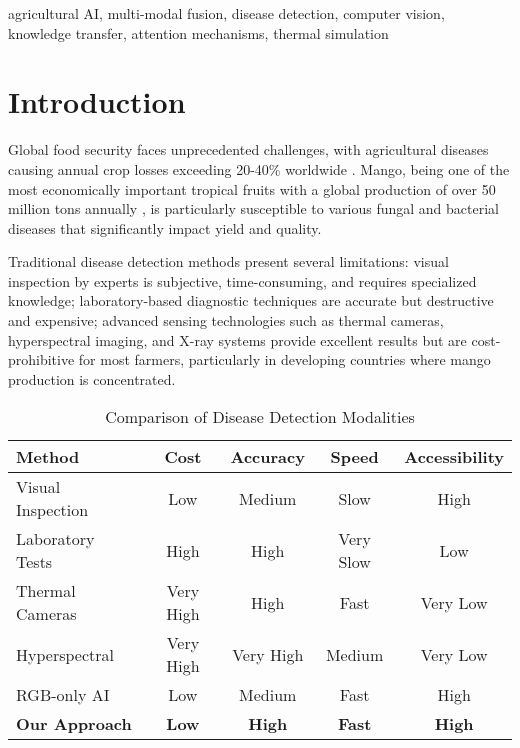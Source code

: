 \documentclass[conference]{IEEEtran}
\begin{document}
\begin{IEEEkeywords}
agricultural AI, multi-modal fusion, disease detection, computer vision, knowledge transfer, attention mechanisms, thermal simulation
\end{IEEEkeywords}

\section{Introduction}

Global food security faces unprecedented challenges, with agricultural diseases causing annual crop losses exceeding 20-40\% worldwide \cite{savary2019global}. Mango, being one of the most economically important tropical fruits with a global production of over 50 million tons annually \cite{fao2022}, is particularly susceptible to various fungal and bacterial diseases that significantly impact yield and quality.

Traditional disease detection methods present several limitations: visual inspection by experts is subjective, time-consuming, and requires specialized knowledge; laboratory-based diagnostic techniques are accurate but destructive and expensive; advanced sensing technologies such as thermal cameras, hyperspectral imaging, and X-ray systems provide excellent results but are cost-prohibitive for most farmers, particularly in developing countries where mango production is concentrated.

\begin{table}[htbp]
\caption{Comparison of Disease Detection Modalities}
\begin{center}
\small
\begin{tabular}{|l|c|c|c|c|}
\hline
\textbf{Method} & \textbf{Cost} & \textbf{Accuracy} & \textbf{Speed} & \textbf{Accessibility} \\
\hline
Visual Inspection & Low & Medium & Slow & High \\
Laboratory Tests & High & High & Very Slow & Low \\
Thermal Cameras & Very High & High & Fast & Very Low \\
Hyperspectral & Very High & Very High & Medium & Very Low \\
RGB-only AI & Low & Medium & Fast & High \\
\textbf{Our Approach} & \textbf{Low} & \textbf{High} & \textbf{Fast} & \textbf{High} \\
\hline
\end{tabular}
\label{tab:method_comparison}
\end{center}
\end{table}
\end{document}
